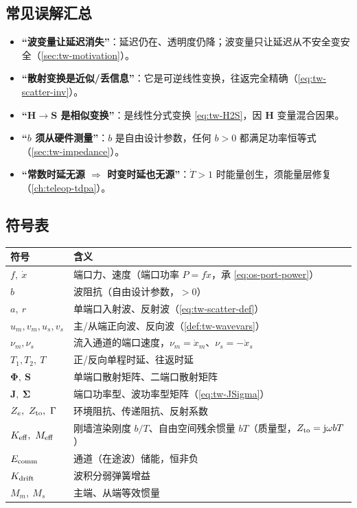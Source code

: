 \subsection*{常见误解汇总}
\begin{itemize}
  \item \textbf{“波变量让延迟消失”}：延迟仍在、透明度仍降；波变量只让延迟从不安全变安全（\cref{sec:tw-motivation}）。
  \item \textbf{“散射变换是近似/丢信息”}：它是可逆线性变换，往返完全精确（\cref{eq:tw-scatter-inv}）。
  \item \textbf{“$\mathbf H\to\mathbf S$ 是相似变换”}：是线性分式变换 \cref{eq:tw-H2S}，因 $\mathbf H$ 变量混合因果。
  \item \textbf{“$b$ 须从硬件测量”}：$b$ 是自由设计参数，任何 $b>0$ 都满足功率恒等式（\cref{sec:tw-impedance}）。
  \item \textbf{“常数时延无源 $\Rightarrow$ 时变时延也无源”}：$\dot T>1$ 时能量创生，须能量层修复（\cref{ch:teleop-tdpa}）。
\end{itemize}

\subsection*{符号表}
\begin{center}\small
\begin{tabular}{ll}
\toprule
符号 & 含义 \\
\midrule
$f,\ \dot x$ & 端口力、速度（端口功率 $P=f\dot x$，承 \cref{eq:os-port-power}） \\
$b$ & 波阻抗（自由设计参数，$>0$） \\
$a,\ r$ & 单端口入射波、反射波（\cref{eq:tw-scatter-def}） \\
$u_m,v_m,u_s,v_s$ & 主/从端正向波、反向波（\cref{def:tw-wavevars}） \\
$\nu_m,\nu_s$ & 流入通道的端口速度，$\nu_m=\dot x_m$、$\nu_s=-\dot x_s$ \\
$T_1,T_2,\ T$ & 正/反向单程时延、往返时延 \\
$\boldsymbol\Phi,\ \mathbf S$ & 单端口散射矩阵、二端口散射矩阵 \\
$\mathbf J,\ \boldsymbol\Sigma$ & 端口功率型、波功率型矩阵（\cref{eq:tw-JSigma}） \\
$Z_e,\ Z_{\rm to},\ \Gamma$ & 环境阻抗、传递阻抗、反射系数 \\
$K_{\rm eff},\ M_{\rm eff}$ & 刚墙渲染刚度 $b/T$、自由空间残余惯量 $bT$（质量型，$Z_{\rm to}=\mathrm j\omega bT$） \\
$E_{\rm comm}$ & 通道（在途波）储能，恒非负 \\
$K_{\rm drift}$ & 波积分弱弹簧增益 \\
$M_m,\ M_s$ & 主端、从端等效惯量 \\
\bottomrule
\end{tabular}
\end{center}

